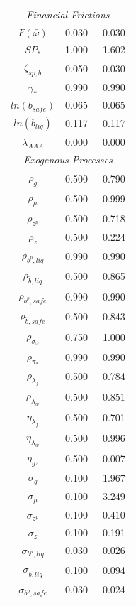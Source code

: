 \documentclass[12pt]{article}
\begin{document}
\begin{longtable}{ccc}
\multicolumn{7}{c}{\textit{Financial Frictions}} \\[3pt]
$ F(\bar{\omega})$ &    0.030 & \   0.030 \\
$ SP_*$ &    1.000 & \   1.602 \\
$ \zeta_{sp,b}$ &    0.050 & \   0.030 \\
$ \gamma_*$ &    0.990 & \   0.990 \\
$ ln(b_{safe})$ &    0.065 & \   0.065 \\
$ ln(b_{liq})$ &    0.117 & \   0.117 \\
$ \lambda_{AAA}$ &    0.000 & \   0.000 \\
\multicolumn{7}{c}{\textit{Exogenous Processes}} \\[3pt]
$ \rho_g$ &    0.500 & \   0.790 \\
$ \rho_{\mu}$ &    0.500 & \   0.999 \\
$ \rho_{z^p}$ &    0.500 & \   0.718 \\
$ \rho_z$ &    0.500 & \   0.224 \\
$ \rho_{b^p,liq}$ &    0.990 & \   0.990 \\
$ \rho_{\tilde{b},liq}$ &    0.500 & \   0.865 \\
$ \rho_{b^p,safe}$ &    0.990 & \   0.990 \\
$ \rho_{\tilde{b},safe}$ &    0.500 & \   0.843 \\
$ \rho_{\sigma_\omega}$ &    0.750 & \   1.000 \\
$ \rho_{\pi_*}$ &    0.990 & \   0.990 \\
$ \rho_{\lambda_f}$ &    0.500 & \   0.784 \\
$ \rho_{\lambda_w}$ &    0.500 & \   0.851 \\
$ \eta_{\lambda_f}$ &    0.500 & \   0.701 \\
$ \eta_{\lambda_w}$ &    0.500 & \   0.996 \\
$ \eta_{gz}$ &    0.500 & \   0.007 \\
$ \sigma_{g}$ &    0.100 & \   1.967 \\
$ \sigma_{\mu}$ &    0.100 & \   3.249 \\
$ \sigma_{z^p}$ &    0.100 & \   0.410 \\
$ \sigma_{z}$ &    0.100 & \   0.191 \\
$ \sigma_{b^p, liq}$ &    0.030 & \   0.026 \\
$ \sigma_{\tilde{b}, liq}$ &    0.100 & \   0.094 \\
$ \sigma_{b^p, safe}$ &    0.030 & \   0.024 \\

\end{longtable}
\end{document}
